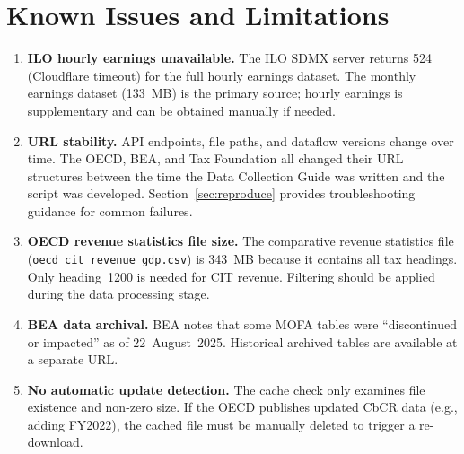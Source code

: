 \documentclass[12pt,a4paper]{article}
\begin{document}
\section{Known Issues and Limitations}\label{sec:issues}

\begin{enumerate}
    \item \textbf{ILO hourly earnings unavailable.}
    The ILO SDMX server returns 524 (Cloudflare timeout) for the full hourly earnings dataset.
    The monthly earnings dataset (133~MB) is the primary source; hourly earnings is supplementary and can be obtained manually if needed.

    \item \textbf{URL stability.}
    API endpoints, file paths, and dataflow versions change over time.
    The OECD, BEA, and Tax Foundation all changed their URL structures between the time the Data Collection Guide was written and the script was developed.
    Section~\ref{sec:reproduce} provides troubleshooting guidance for common failures.

    \item \textbf{OECD revenue statistics file size.}
    The comparative revenue statistics file (\texttt{oecd\_cit\_revenue\_gdp.csv}) is 343~MB because it contains all tax headings.
    Only heading~1200 is needed for CIT revenue.
    Filtering should be applied during the data processing stage.

    \item \textbf{BEA data archival.}
    BEA notes that some MOFA tables were ``discontinued or impacted'' as of 22~August~2025.
    Historical archived tables are available at a separate URL.

    \item \textbf{No automatic update detection.}
    The cache check only examines file existence and non-zero size.
    If the OECD publishes updated CbCR data (e.g., adding FY2022), the cached file must be manually deleted to trigger a re-download.
\end{enumerate}


\printbibliography
\end{document}
